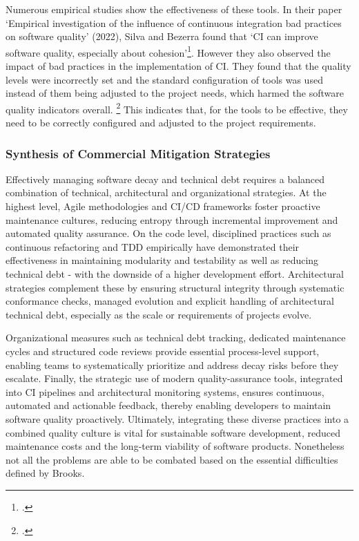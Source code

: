 Numerous empirical studies show the effectiveness of these tools. In their paper `Empirical investigation of the influence of continuous integration bad practices on software quality' (2022),
Silva and Bezerra found that `CI can improve software quality, especially about cohesion'\footcite[4]{silvaEmpiricalInvestigationInfluence2022}. However they also observed the impact
of bad practices in the implementation of CI. They found that the quality levels were incorrectly set and the standard configuration of tools was used instead of them being adjusted to the project needs, which harmed the software quality indicators overall. \footcite[4]{silvaEmpiricalInvestigationInfluence2022}
This indicates that, for the tools to be effective, they need to be correctly configured and adjusted to the project requirements.

\subsubsection{Synthesis of Commercial Mitigation Strategies}
Effectively managing software decay and technical debt requires a balanced combination of technical, architectural and organizational strategies.
At the highest level, Agile methodologies and \ac{CI/CD} frameworks foster proactive maintenance cultures, reducing entropy through incremental improvement
and automated quality assurance. On the code level, disciplined practices such as continuous refactoring and \ac{TDD} empirically have demonstrated their effectiveness
in maintaining modularity and testability as well as reducing technical debt - with the downside of a higher development effort. Architectural strategies complement these
by ensuring structural integrity through systematic conformance checks, managed evolution and explicit handling of architectural technical debt, especially as
the scale or requirements of projects evolve.

Organizational measures such as technical debt tracking, dedicated maintenance cycles and structured code reviews provide essential process-level support,
enabling teams to systematically prioritize and address decay risks before they escalate. Finally, the strategic use of modern quality-assurance tools, integrated
into \ac{CI} pipelines and architectural monitoring systems, ensures continuous, automated and actionable feedback, thereby enabling developers to maintain
software quality proactively. Ultimately, integrating these diverse practices into a combined quality culture is vital for sustainable software development,
reduced maintenance costs and the long-term viability of software products. Nonetheless not all the problems are able to be combated based on the essential difficulties defined by Brooks.

